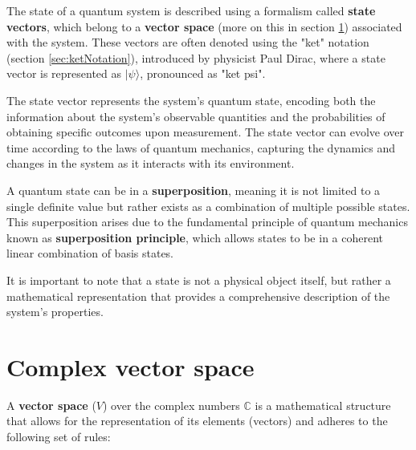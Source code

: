 		\par The state of a quantum system is described using a formalism called \textbf{state vectors}, which belong to a \textbf{vector space} (more on this in section \ref{sec:vectorspace}) associated with the system. These vectors are often denoted using the "ket" notation (section \ref{sec:ketNotation}), introduced by physicist Paul Dirac, where a state vector is represented as $|\psi\rangle$, pronounced as "ket psi".\newline
		
		\par The state vector represents the system's quantum state, encoding both the information about the system's observable quantities and the probabilities of obtaining specific outcomes upon measurement. The state vector can evolve over time according to the laws of quantum mechanics, capturing the dynamics and changes in the system as it interacts with its environment.\newline
		
		\par A quantum state can be in a \textbf{superposition}, meaning it is not limited to a single definite value but rather exists as a combination of multiple possible states. This superposition arises due to the fundamental principle of quantum mechanics known as \textbf{superposition principle}, which allows states to be in a coherent linear combination of basis states.\newline
		
		\par It is important to note that a state is not a physical object itself, but rather a mathematical representation that provides a comprehensive description of the system's properties.
	
	\section{Complex vector space}
		\label{sec:vectorspace}
		\par A \textbf{vector space} ($V$) over the complex numbers $\mathbb{C}$ is a mathematical structure that allows for the representation of its elements (vectors) and adheres to the following set of rules:
		
